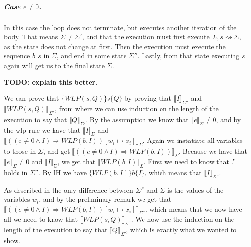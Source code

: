 \subparagraph{Case $e \neq 0 $.}
In this case the loop does not terminate, but executes another iteration of the body.
That means $\Sigma \neq \Sigma'$, and that the execution must first execute $\Sigma, s \rightsquigarrow \Sigma$, as the state does not change at first.
Then the execution must execute the sequence $b;s$ in $\Sigma$, and end in some state $\Sigma''$.
Lastly, from that state executing $s$ again will get us to the final state $\Sigma$.

\textbf{TODO: explain this better}.

We can prove that $\{WLP(s, Q)\}s\{Q\}$ by proving that $\llbracket I \rrbracket_{\Sigma''}$ and $\llbracket WLP(s, Q)\rrbracket_{\Sigma''}$, from where we can use induction on the length of the execution to say that $\llbracket Q \rrbracket_{\Sigma'}$.
By the assumption we know that $\llbracket e \rrbracket_{\Sigma} \neq 0$, and by the wlp rule we have that $\llbracket I \rrbracket_{\Sigma}$ and $\llbracket ((e \neq 0 \land I) \Rightarrow WLP(b, I)) [ w_{i} \mapsto x_{i}] \rrbracket_{\Sigma}$.
Again we instatiate all variables to those in $\Sigma$, and get $\llbracket ((e \neq 0 \land I) \Rightarrow WLP(b, I)) \rrbracket_{\Sigma}$.
Because we have that $\llbracket e \rrbracket_{\Sigma} \neq 0$ and $\llbracket I \rrbracket_{\Sigma}$, we get that $\llbracket WLP(b, I) \rrbracket_{\Sigma}$.
First we need to know that $I$ holds in $\Sigma''$. By IH we have $\{WLP(b, I)\}b\{I\}$, which means that $\llbracket I \rrbracket_{\Sigma''}$.

As described in \cite{wlp} the only difference between $\Sigma''$ and $\Sigma$ is the values of the variables $w_{i}$, and by the preliminary remark we get that $\llbracket ((e \neq 0 \land I) \Rightarrow WLP(b, I)) [ w_{i} \mapsto x_{i}] \rrbracket_{\Sigma''}$, which means that we now have all we need to know that $\llbracket WLP(s, Q) \rrbracket_{\Sigma''}$.
We now use the induction on the length of the execution to say that $\llbracket Q \rrbracket_{\Sigma'}$, which is exactly what we wanted to show.
